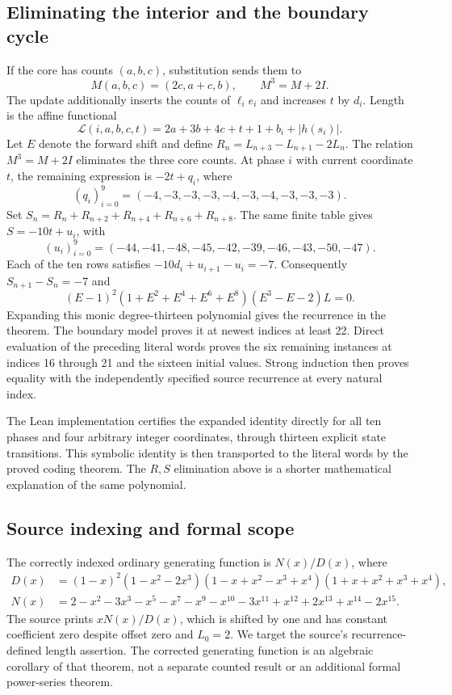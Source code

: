 \subsection{Eliminating the interior and the boundary cycle}
If the core has counts $(a,b,c)$, substitution sends them to
\[
M(a,b,c)=(2c,a+c,b),\qquad M^3=M+2I.
\]
The update additionally inserts the counts of $\ell_i e_i$ and increases
$t$ by $d_i$. Length is the affine functional
\[
\mathcal L(i,a,b,c,t)=2a+3b+4c+t+1+b_i+|h(s_i)|.
\]
Let $E$ denote the forward shift and define
$R_n=L_{n+3}-L_{n+1}-2L_n$. The relation $M^3=M+2I$ eliminates
the three core counts. At phase $i$ with current coordinate $t$, the
remaining expression is $-2t+q_i$, where
\[
(q_i)_{i=0}^9=(-4,-3,-3,-3,-4,-3,-4,-3,-3,-3).
\]
Set $S_n=R_n+R_{n+2}+R_{n+4}+R_{n+6}+R_{n+8}$. The same finite table
gives $S=-10t+u_i$, with
\[
(u_i)_{i=0}^9=(-44,-41,-48,-45,-42,-39,-46,-43,-50,-47).
\]
Each of the ten rows satisfies $-10d_i+u_{i+1}-u_i=-7$.
Consequently $S_{n+1}-S_n=-7$ and
\begin{equation}
(E-1)^2(1+E^2+E^4+E^6+E^8)(E^3-E-2)L=0.
\label{eq:a288511:annihilator}
\end{equation}
Expanding this monic degree-thirteen polynomial gives the recurrence in
the theorem. The boundary model proves it at newest indices at least
22. Direct evaluation of the preceding literal words proves the six
remaining instances at indices 16 through 21 and the sixteen initial
values. Strong induction then proves equality with the independently
specified source recurrence at every natural index.

The Lean implementation certifies the expanded identity directly for
all ten phases and four arbitrary integer coordinates, through thirteen
explicit state transitions. This symbolic identity is then transported
to the literal words by the proved coding theorem. The $R,S$ elimination
above is a shorter mathematical explanation of the same polynomial.

\subsection{Source indexing and formal scope}
The correctly indexed ordinary generating function is $N(x)/D(x)$, where
\begin{align*}
D(x)&=(1-x)^2(1-x^2-2x^3)(1-x+x^2-x^3+x^4)(1+x+x^2+x^3+x^4),\\
N(x)&=2-x^2-3x^3-x^5-x^7-x^9-x^{10}-3x^{11}+x^{12}+2x^{13}+x^{14}-2x^{15}.
\end{align*}
The source prints $xN(x)/D(x)$, which is shifted by one and has constant
coefficient zero despite offset zero and $L_0=2$. We target the source's
recurrence-defined length assertion. The corrected generating function
is an algebraic corollary of that theorem, not a separate counted result
or an additional formal power-series theorem.

